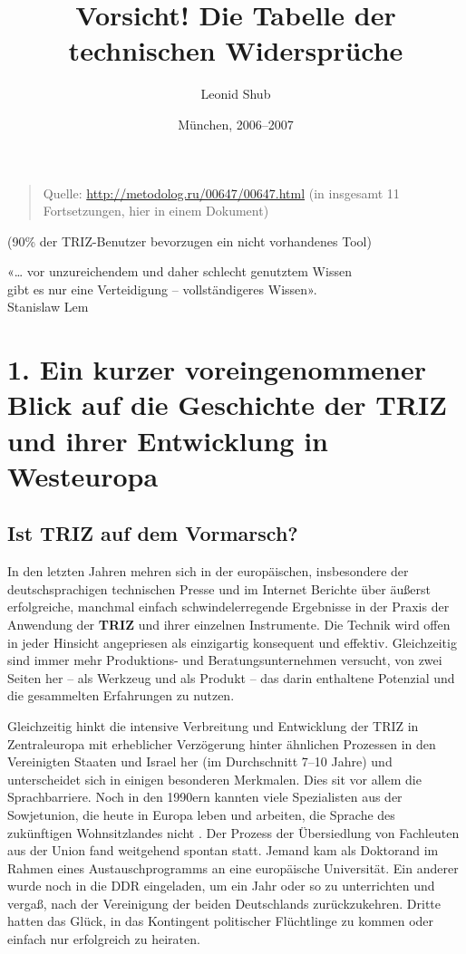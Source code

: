 \documentclass[11pt,a4paper]{article}
\title{Vorsicht! Die Tabelle der technischen Widersprüche}
\author{Leonid Shub}
\date{München, 2006--2007}
\begin{document}
\maketitle

\begin{quote}
  Quelle: \url{http://metodolog.ru/00647/00647.html} (in insgesamt 11
  Fortsetzungen, hier in einem Dokument)
\end{quote}

(90\% der TRIZ-Benutzer bevorzugen ein nicht vorhandenes Tool)

\begin{flushright}
  «… vor unzureichendem und daher schlecht genutztem Wissen\\ gibt es nur eine
  Verteidigung -- vollständigeres Wissen».\\ Stanislaw Lem
\end{flushright}
\section*{1. Ein kurzer voreingenommener Blick auf die Geschichte der TRIZ und
  ihrer Entwicklung in Westeuropa}

\subsection*{Ist TRIZ auf dem Vormarsch?}

In den letzten Jahren mehren sich in der europäischen, insbesondere der
deutschsprachigen technischen Presse und im Internet Berichte über äußerst
erfolgreiche, manchmal einfach schwindelerregende Ergebnisse in der Praxis der
Anwendung der \textbf{TRIZ} und ihrer einzelnen Instrumente. Die Technik wird
offen in jeder Hinsicht angepriesen als einzigartig konsequent und effektiv.
Gleichzeitig sind immer mehr Produktions- und Beratungsunternehmen versucht,
von zwei Seiten her -- als Werkzeug und als Produkt -- das darin enthaltene
Potenzial und die gesammelten Erfahrungen zu nutzen.

Gleichzeitig hinkt die intensive Verbreitung und Entwicklung der TRIZ in
Zentraleuropa mit erheblicher Verzögerung hinter ähnlichen Prozessen in den
Vereinigten Staaten und Israel her (im Durchschnitt 7--10 Jahre) und
unterscheidet sich in einigen besonderen Merkmalen. Dies sit vor allem die
Sprachbarriere. Noch in den 1990ern kannten viele Spezialisten aus der
Sowjetunion, die heute in Europa leben und arbeiten, die Sprache des
zukünftigen Wohnsitzlandes nicht \cite{Shub2004}.  Der Prozess der
Übersiedlung von Fachleuten aus der Union fand weitgehend spontan
statt. Jemand kam als Doktorand im Rahmen eines Austauschprogramms an eine
europäische Universität. Ein anderer wurde noch in die DDR eingeladen, um ein
Jahr oder so zu unterrichten und vergaß, nach der Vereinigung der beiden
Deutschlands zurückzukehren. Dritte hatten das Glück, in das Kontingent
politischer Flüchtlinge zu kommen oder einfach nur erfolgreich zu heiraten.
\end{document}

